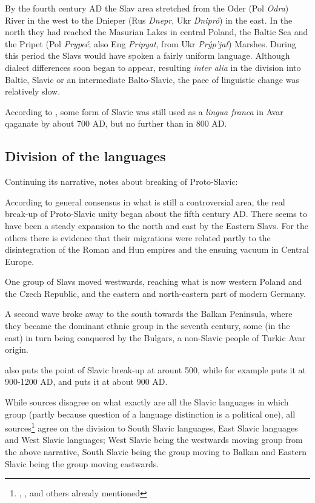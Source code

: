 \begin{quotee}By the fourth century AD the Slav area
stretched from the Oder (Pol \emph{Odra}) River in the west to the Dnieper (Rus \emph{Dnepr},
Ukr \emph{Dnipró}) in the east. In the north they had reached the Masurian Lakes in
central Poland, the Baltic Sea and the Pripet (Pol \emph{Prypeć}; also Eng \emph{Pripyat}, from
Ukr \emph{Prýp’jať}) Marshes. During this period the Slavs would have spoken a fairly
uniform language. Although dialect differences soon began to appear, resulting
\emph{inter alia} in the division into Baltic, Slavic or an intermediate Balto-Slavic, the pace
of linguistic change was relatively slow.\end{quotee}

According to \cite{curta2004slavic}, some form of Slavic was still used as a \emph{lingua franca} in Avar qaganate by about 700 AD, but no further than in 800 AD.

\subsection{Division of the languages}


Continuing its narrative, \cite{sussex2011slavic} notes about breaking of Proto-Slavic:
\begin{quotee}According to general consensus in what is still a controversial area, the real break-up
of Proto-Slavic unity began about the fifth century AD. There seems to have been a
steady expansion to the north and east by the Eastern Slavs. For the others there is
evidence that their migrations were related partly to the disintegration of the Roman
and Hun empires and the ensuing vacuum in Central Europe. 

One group of Slavs
moved westwards, reaching what is now western Poland and the Czech Republic, and
the eastern and north-eastern part of modern Germany. 

A second wave broke away
to the south towards the Balkan Peninsula, where they became the dominant ethnic
group in the seventh century, some (in the east) in turn being conquered by the
Bulgars, a non-Slavic people of Turkic Avar origin.\end{quotee}

\cite{oxfordintro} also puts the point of Slavic break-up at arount 500, while for example \cite{kortlandt1982early} puts it at 900-1200 AD, and \cite{schenker1993proto} puts it at about 900 AD.


While sources disagree on what exactly are all the Slavic languages in which group (partly because question of a language distinction is a political one), all sources\footnote{\cite{sussex2011slavic}, \cite{oxfordintro}, \cite{kortlandt1982early} and others already mentioned} agree on the division to South Slavic languages, East Slavic languages and West Slavic languages; West Slavic being the westwards moving group from the above narrative, South Slavic being the group moving to Balkan and Eastern Slavic being the group moving eastwards.

